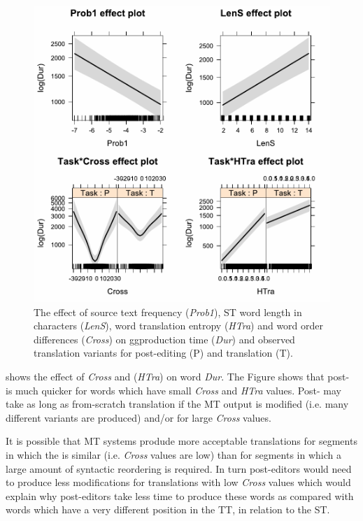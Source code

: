 \documentclass[output=paper]{LSP/langsci}
\begin{document}
\begin{figure}[p] 
\includegraphics[width=\textwidth]{figures/carl-schaefer/HTRA_Cross_TRA_PE_DUR.pdf} 
\caption{The effect of source text frequency (\textit{Prob1}), ST word length in characters (\textit{LenS}), word
translation entropy (\textit{HTra}) and word order differences (\textit{Cross}) on gg{production time} (\textit{Dur}) and
observed translation variants for post-editing (P) and translation (T).}
\label{carl-schaeffer:fig:stfreq}
\end{figure}

 shows the effect of \textit{Cross} and  (\textit{HTra}) on word  \textit{Dur}. The Figure shows that post- is much quicker for words which have small \textit{Cross} and \textit{HTra} values. Post- may take as long as from-scratch translation if the MT output is modified (i.e. many different variants are produced) and/or for large \textit{Cross} values.

It is possible that MT systems produde more acceptable translations for segments in which the  is similar (i.e. \textit{Cross} values are low) than for segments in which a large amount of syntactic reordering is required. In turn post-editors would need to produce less modifications for translations with low \textit{Cross} values which would explain why post-editors take less time to produce these words as compared with words which have a very different position in the TT, in relation to the ST. 
\end{document}

